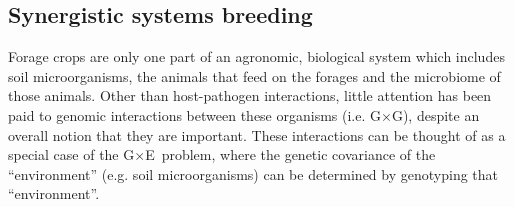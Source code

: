 \documentclass[11pt]{article}
\newcommand{\gxe}{G$\times$E}
\newcommand{\gxg}{G$\times$G}
\begin{document}







\subsection*{Synergistic systems breeding}

Forage crops are only one part of an agronomic, biological system which includes soil microorganisms, the animals that feed on the forages and the microbiome of those animals. Other than host-pathogen interactions, little attention has been paid to genomic interactions between these organisms (i.e. \gxg), despite an overall notion that they are important. These interactions can be thought of as a special case of the \gxe\ problem, where the genetic covariance of the ``environment'' (e.g. soil microorganisms) can be determined by genotyping that ``environment''. %
\end{document}
